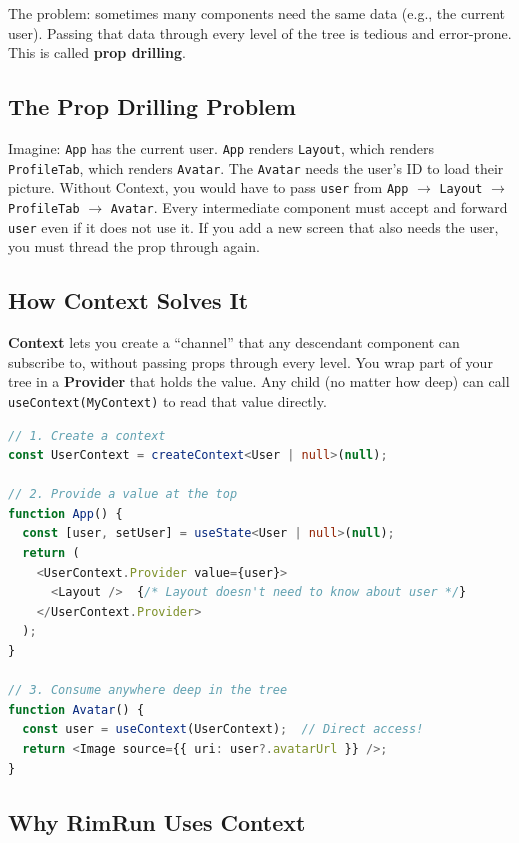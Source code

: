 \documentclass[11pt,a4paper]{article}
\begin{document}
The problem: sometimes many components need the same data (e.g., the current user). Passing that data through every level of the tree is tedious and error-prone. This is called \textbf{prop drilling}.

\subsection{The Prop Drilling Problem}

Imagine: \texttt{App} has the current user. \texttt{App} renders \texttt{Layout}, which renders \texttt{ProfileTab}, which renders \texttt{Avatar}. The \texttt{Avatar} needs the user's ID to load their picture. Without Context, you would have to pass \texttt{user} from \texttt{App} $\rightarrow$ \texttt{Layout} $\rightarrow$ \texttt{ProfileTab} $\rightarrow$ \texttt{Avatar}. Every intermediate component must accept and forward \texttt{user} even if it does not use it. If you add a new screen that also needs the user, you must thread the prop through again.

\subsection{How Context Solves It}

\textbf{Context} lets you create a ``channel'' that any descendant component can subscribe to, without passing props through every level. You wrap part of your tree in a \textbf{Provider} that holds the value. Any child (no matter how deep) can call \texttt{useContext(MyContext)} to read that value directly.

\begin{lstlisting}[language=TypeScript, caption=Conceptual Context Usage]
// 1. Create a context
const UserContext = createContext<User | null>(null);

// 2. Provide a value at the top
function App() {
  const [user, setUser] = useState<User | null>(null);
  return (
    <UserContext.Provider value={user}>
      <Layout />  {/* Layout doesn't need to know about user */}
    </UserContext.Provider>
  );
}

// 3. Consume anywhere deep in the tree
function Avatar() {
  const user = useContext(UserContext);  // Direct access!
  return <Image source={{ uri: user?.avatarUrl }} />;
}
\end{lstlisting}

\subsection{Why RimRun Uses Context}
\end{document}
